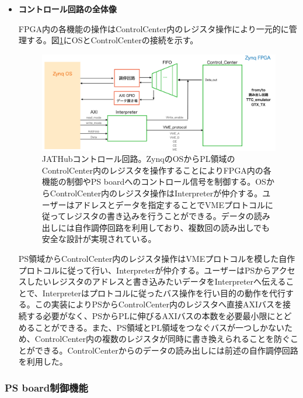 \begin{itemize}
\item{\textbf{コントロール回路の全体像}}

FPGA内の各機能の操作はControlCenter内のレジスタ操作により一元的に管理する。図\ref{JATHubccenter}にOSとControlCenterの接続を示す。

\begin{figure} 
\centering
\includegraphics[width=16cm]{fig/JATHubccenter.png}
\caption[JATHubコントロール回路]{JATHubコントロール回路。ZynqのOSからPL領域のControlCenter内のレジスタを操作することによりFPGA内の各機能の制御やPS boardへのコントロール信号を制御する。OSからControlCenter内のレジスタ操作はInterpreterが仲介する。ユーザーはアドレスとデータを指定することでVMEプロトコルに従ってレジスタの書き込みを行うことができる。データの読み出しには自作調停回路を利用しており、複数回の読み出しでも安全な設計が実現されている。}
\label{JATHubccenter}
\end{figure}

PS領域からControlCenter内のレジスタ操作はVMEプロトコルを模した自作プロトコルに従って行い、Interpreterが仲介する。ユーザーはPSからアクセスしたいレジスタのアドレスと書き込みたいデータをInterpreterへ伝えることで、Interpreterはプロトコルに従ったバス操作を行い目的の動作を代行する。この実装によりPSからControlCenter内のレジスタへ直接AXIバスを接続する必要がなく、PSからPLに伸びるAXIバスの本数を必要最小限にとどめることができる。また、PS領域とPL領域をつなぐバスが一つしかないため、ControlCenter内の複数のレジスタが同時に書き換えられることを防ぐことができる。ControlCenterからのデータの読み出しには前述の自作調停回路を利用した。
\baselineskip
\end{itemize}

\subsubsection{\textbf{PS board制御機能}}

